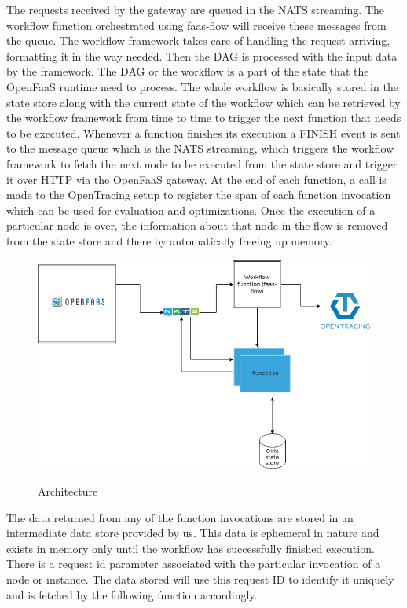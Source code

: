 \documentclass[12pt,titlepage]{article}
\begin{document}
The requests received by the gateway are queued in the NATS streaming. The
workflow function orchestrated using faas-flow will receive these messages from
the queue. The workflow framework takes care of handling the request arriving,
formatting it in the way needed. Then the DAG is processed with the input data
by the framework. The DAG or the workflow is a part of the state that the
OpenFaaS runtime need to process. The whole workflow is basically stored in the
state store along with the current state of the workflow which can be retrieved
by the workflow framework from time to time to trigger the next function that
needs to be executed. Whenever a function finishes its execution a FINISH event
is sent to the message queue which is the NATS streaming, which triggers the
workflow framework to fetch the next node to be executed from the state store
and trigger it over HTTP via the OpenFaaS gateway. At the end of each function,
a call is made to the OpenTracing setup to register the span of each function
invocation which can be used for evaluation and optimizations. Once the
execution of a particular node is over, the information about that node in the
flow is removed from the state store and there by automatically freeing up memory.

\begin{figure}[!h]
    \caption{Architecture}
    \centering
    \includegraphics[width=130mm]{./thesis_images/architecture.png}
    \label{fig:arch}
\end{figure}

The data returned from any of the function invocations are stored in an
intermediate data store provided by us. This data is ephemeral in nature and
exists in memory only until the workflow has successfully finished execution.
There is a request id parameter associated with the particular invocation of a
node or instance. The data stored will use this request ID to identify it
uniquely and is fetched by the following function accordingly.
\end{document}
